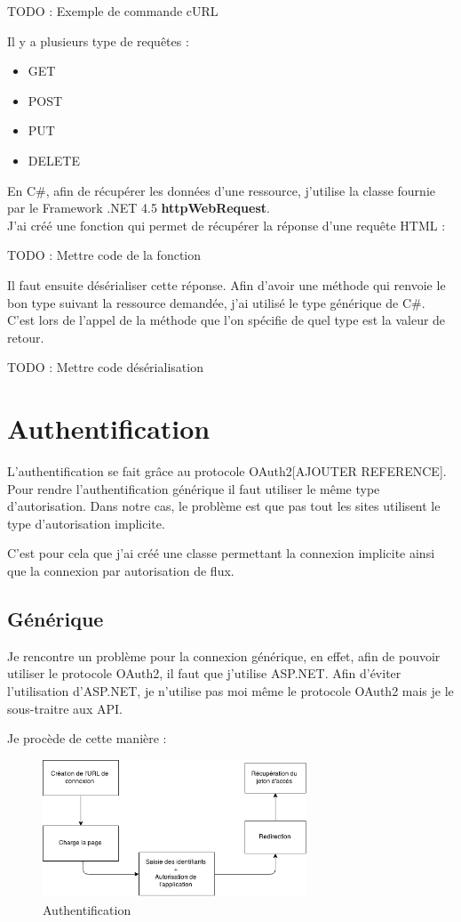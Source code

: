 \documentclass[11pt]{report} %
\begin{document}
		TODO : Exemple de commande cURL
		
		Il y a plusieurs type de requêtes :
		\begin{itemize}
			\item GET
			\item POST
			\item PUT
			\item DELETE
		\end{itemize}
		
		En C\#, afin de récupérer les données d'une ressource, j'utilise la classe fournie par le Framework .NET 4.5 \textbf{httpWebRequest}.\\		
		J'ai créé une fonction qui permet de récupérer la réponse d'une requête HTML :
		
		TODO : Mettre code de la fonction
		
		Il faut ensuite désérialiser cette réponse. Afin d’avoir une méthode qui renvoie le bon type suivant la ressource demandée, j’ai utilisé le type générique de C\#. C'est lors de l'appel de la méthode que l'on spécifie de quel type est la valeur de retour.
		
		TODO : Mettre code désérialisation 
		
	
	\section{Authentification}
	L'authentification se fait grâce au protocole OAuth2[AJOUTER REFERENCE]. Pour rendre l'authentification générique il faut utiliser le même type d'autorisation. Dans notre cas, le problème est que pas tout les sites utilisent le type d'autorisation implicite.
	
	C'est pour cela que j'ai créé une classe permettant la connexion implicite ainsi que la connexion par autorisation de flux.
	
	\subsection{Générique}
	Je rencontre un problème pour la connexion générique, en effet, afin de pouvoir utiliser le protocole OAuth2, il faut que j'utilise ASP.NET. 
	Afin d'éviter l'utilisation d'ASP.NET, je n'utilise pas moi même le protocole OAuth2 mais je le sous-traitre aux API.
	
	Je procède de cette manière :
	
			\begin{figure}[h]
				\center
				\includegraphics[width=0.7\textwidth]{../img/auth.png}
				\caption{Authentification}
				\label{authentification}
			\end{figure}
	
\end{document}
